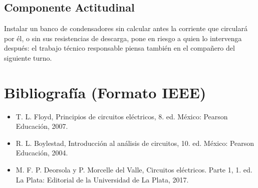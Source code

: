 \documentclass[11pt,letterpaper]{article}
\begin{document}
\subsection*{Componente Actitudinal}

\begin{cita}
Instalar un banco de condensadores sin calcular antes la corriente que circulará por él, o sin sus resistencias de descarga, pone en riesgo a quien lo intervenga después: el trabajo técnico responsable piensa también en el compañero del siguiente turno.
\end{cita}

\section{Bibliografía (Formato IEEE)}

{\sloppy
\begin{itemize}[leftmargin=2.6em, labelwidth=2.2em, labelsep=0.4em, align=left]
  \item[{[1]}] T. L. Floyd, Principios de circuitos eléctricos, 8.\textordfeminine{} ed. México: Pearson Educación, 2007.
  \item[{[2]}] R. L. Boylestad, Introducción al análisis de circuitos, 10.\textordfeminine{} ed. México: Pearson Educación, 2004.
  \item[{[3]}] M. F. P. Deorsola y P. Morcelle del Valle, Circuitos eléctricos. Parte 1, 1.\textordfeminine{} ed. La Plata: Editorial de la Universidad de La Plata, 2017.
\end{itemize}
}
\end{document}
